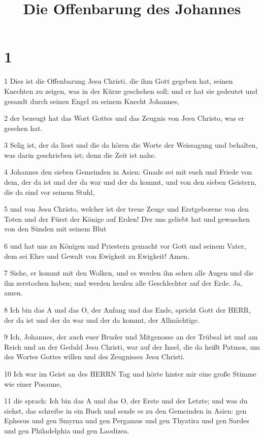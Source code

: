 

\title{Die Offenbarung des Johannes}


\chapter{1}

\par 1 Dies ist die Offenbarung Jesu Christi, die ihm Gott gegeben hat, seinen Knechten zu zeigen, was in der Kürze geschehen soll; und er hat sie gedeutet und gesandt durch seinen Engel zu seinem Knecht Johannes,
\par 2 der bezeugt hat das Wort Gottes und das Zeugnis von Jesu Christo, was er gesehen hat.
\par 3 Selig ist, der da liest und die da hören die Worte der Weissagung und behalten, was darin geschrieben ist; denn die Zeit ist nahe.
\par 4 Johannes den sieben Gemeinden in Asien: Gnade sei mit euch und Friede von dem, der da ist und der da war und der da kommt, und von den sieben Geistern, die da sind vor seinem Stuhl,
\par 5 und von Jesu Christo, welcher ist der treue Zeuge und Erstgeborene von den Toten und der Fürst der Könige auf Erden! Der uns geliebt hat und gewaschen von den Sünden mit seinem Blut
\par 6 und hat uns zu Königen und Priestern gemacht vor Gott und seinem Vater, dem sei Ehre und Gewalt von Ewigkeit zu Ewigkeit! Amen.
\par 7 Siehe, er kommt mit den Wolken, und es werden ihn sehen alle Augen und die ihn zerstochen haben; und werden heulen alle Geschlechter auf der Erde. Ja, amen.
\par 8 Ich bin das A und das O, der Anfang und das Ende, spricht Gott der HERR, der da ist und der da war und der da kommt, der Allmächtige.
\par 9 Ich, Johannes, der auch euer Bruder und Mitgenosse an der Trübsal ist und am Reich und an der Geduld Jesu Christi, war auf der Insel, die da heißt Patmos, um des Wortes Gottes willen und des Zeugnisses Jesu Christi.
\par 10 Ich war im Geist an des HERRN Tag und hörte hinter mir eine große Stimme wie einer Posaune,
\par 11 die sprach: Ich bin das A und das O, der Erste und der Letzte; und was du siehst, das schreibe in ein Buch und sende es zu den Gemeinden in Asien: gen Ephesus und gen Smyrna und gen Pergamus und gen Thyatira und gen Sardes und gen Philadelphia und gen Laodizea.
